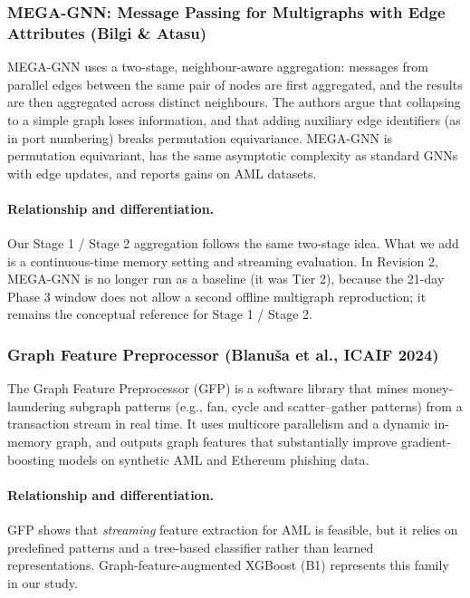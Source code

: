 \documentclass[11pt,a4paper]{article}
\begin{document}
\subsubsection{MEGA-GNN: Message Passing for Multigraphs with Edge Attributes (Bilgi \& Atasu)}
MEGA-GNN \cite{bilgi2026mega} uses a two-stage, neighbour-aware aggregation: messages from parallel edges between the same pair of nodes are first aggregated, and the results are then aggregated across distinct neighbours. The authors argue that collapsing to a simple graph loses information, and that adding auxiliary edge identifiers (as in port numbering) breaks permutation equivariance. MEGA-GNN is permutation equivariant, has the same asymptotic complexity as standard GNNs with edge updates, and reports gains on AML datasets.

\paragraph{Relationship and differentiation.} Our Stage 1 / Stage 2 aggregation follows the same two-stage idea. What we add is a continuous-time memory setting and streaming evaluation. In Revision 2, MEGA-GNN is no longer run as a baseline (it was Tier 2), because the 21-day Phase 3 window does not allow a second offline multigraph reproduction; it remains the conceptual reference for Stage 1 / Stage 2.

\subsubsection{Graph Feature Preprocessor (Blanu\v{s}a et al., ICAIF 2024)}
The Graph Feature Preprocessor (GFP) \cite{blanusa2024gfp} is a software library that mines money-laundering subgraph patterns (e.g., fan, cycle and scatter--gather patterns) from a transaction stream in real time. It uses multicore parallelism and a dynamic in-memory graph, and outputs graph features that substantially improve gradient-boosting models on synthetic AML and Ethereum phishing data.

\paragraph{Relationship and differentiation.} GFP shows that \emph{streaming} feature extraction for AML is feasible, but it relies on predefined patterns and a tree-based classifier rather than learned representations. Graph-feature-augmented XGBoost (B1) represents this family in our study.
\end{document}
